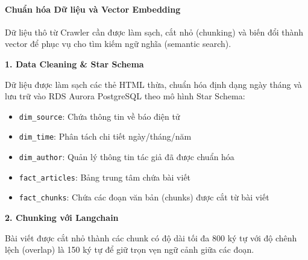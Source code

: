 \hypertarget{chuux1ea9n-huxf3a-dux1eef-liux1ec7u-vuxe0-vector-embedding}{%
\paragraph{Chuẩn hóa Dữ liệu và Vector
Embedding}}

Dữ liệu thô từ Crawler cần được làm sạch, cắt nhỏ (chunking) và biến đổi
thành vector để phục vụ cho tìm kiếm ngữ nghĩa (semantic search).

\textbf{1. Data Cleaning \& Star Schema}

Dữ liệu được làm sạch các thẻ HTML thừa, chuẩn hóa định dạng ngày tháng
và lưu trữ vào RDS Aurora PostgreSQL theo mô hình Star Schema:

\begin{itemize}
\tightlist
\item
  \texttt{dim\_source}: Chứa thông tin về báo điện tử
\item
  \texttt{dim\_time}: Phân tách chi tiết ngày/tháng/năm
\item
  \texttt{dim\_author}: Quản lý thông tin tác giả đã được chuẩn hóa
\item
  \texttt{fact\_articles}: Bảng trung tâm chứa bài viết
\item
  \texttt{fact\_chunks}: Chứa các đoạn văn bản (chunks) được cắt từ bài
  viết
\end{itemize}

\textbf{2. Chunking với Langchain}

Bài viết được cắt nhỏ thành các chunk có độ dài tối đa 800 ký tự với độ
chênh lệch (overlap) là 150 ký tự để giữ trọn vẹn ngữ cảnh giữa các
đoạn.

\begin{Shaded}
\begin{Highlighting}[]

\OperatorTok{=}
\OperatorTok{=}\NormalTok{,}
\OperatorTok{=}\NormalTok{,}
\OperatorTok{=}\NormalTok{[}\NormalTok{, }\NormalTok{, }\NormalTok{, }\NormalTok{, }\NormalTok{]}
\NormalTok{)}

\OperatorTok{=}
\end{Highlighting}
\end{Shaded}

